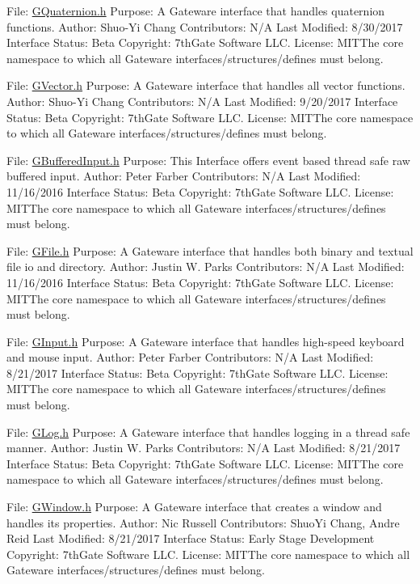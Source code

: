 File\+: \hyperlink{GQuaternion_8h_source}{G\+Quaternion.\+h} Purpose\+: A Gateware interface that handles quaternion functions. Author\+: Shuo-\/\+Yi Chang Contributors\+: N/A Last Modified\+: 8/30/2017 Interface Status\+: Beta Copyright\+: 7th\+Gate Software L\+LC. License\+: M\+I\+T\+The core namespace to which all Gateware interfaces/structures/defines must belong.

File\+: \hyperlink{GVector_8h_source}{G\+Vector.\+h} Purpose\+: A Gateware interface that handles all vector functions. Author\+: Shuo-\/\+Yi Chang Contributors\+: N/A Last Modified\+: 9/20/2017 Interface Status\+: Beta Copyright\+: 7th\+Gate Software L\+LC. License\+: M\+I\+T\+The core namespace to which all Gateware interfaces/structures/defines must belong.

File\+: \hyperlink{GBufferedInput_8h_source}{G\+Buffered\+Input.\+h} Purpose\+: This Interface offers event based thread safe raw buffered input. Author\+: Peter Farber Contributors\+: N/A Last Modified\+: 11/16/2016 Interface Status\+: Beta Copyright\+: 7th\+Gate Software L\+LC. License\+: M\+I\+T\+The core namespace to which all Gateware interfaces/structures/defines must belong.

File\+: \hyperlink{GFile_8h_source}{G\+File.\+h} Purpose\+: A Gateware interface that handles both binary and textual file io and directory. Author\+: Justin W. Parks Contributors\+: N/A Last Modified\+: 11/16/2016 Interface Status\+: Beta Copyright\+: 7th\+Gate Software L\+LC. License\+: M\+I\+T\+The core namespace to which all Gateware interfaces/structures/defines must belong.

File\+: \hyperlink{GInput_8h_source}{G\+Input.\+h} Purpose\+: A Gateware interface that handles high-\/speed keyboard and mouse input. Author\+: Peter Farber Contributors\+: N/A Last Modified\+: 8/21/2017 Interface Status\+: Beta Copyright\+: 7th\+Gate Software L\+LC. License\+: M\+I\+T\+The core namespace to which all Gateware interfaces/structures/defines must belong.

File\+: \hyperlink{GLog_8h_source}{G\+Log.\+h} Purpose\+: A Gateware interface that handles logging in a thread safe manner. Author\+: Justin W. Parks Contributors\+: N/A Last Modified\+: 8/21/2017 Interface Status\+: Beta Copyright\+: 7th\+Gate Software L\+LC. License\+: M\+I\+T\+The core namespace to which all Gateware interfaces/structures/defines must belong.

File\+: \hyperlink{GWindow_8h_source}{G\+Window.\+h} Purpose\+: A Gateware interface that creates a window and handles its properties. Author\+: Nic Russell Contributors\+: Shuo\+Yi Chang, Andre Reid Last Modified\+: 8/21/2017 Interface Status\+: Early Stage Development Copyright\+: 7th\+Gate Software L\+LC. License\+: M\+I\+T\+The core namespace to which all Gateware interfaces/structures/defines must belong. 